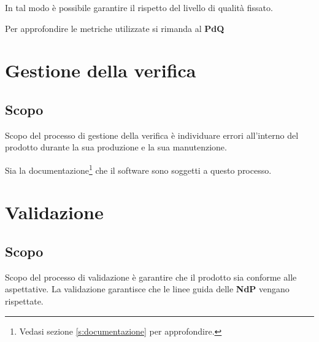 In tal modo è possibile garantire il rispetto del livello
di qualità fissato.

Per approfondire le metriche utilizzate si rimanda al \textbf{PdQ}

\section{Gestione della verifica}\label{s:verifica}
\subsection{Scopo}

Scopo del processo di gestione della verifica è individuare errori all'interno del prodotto durante la sua produzione e la sua manutenzione.

Sia la documentazione\footnote{Vedasi sezione \ref{s:documentazione} per approfondire.} che il software sono soggetti a questo processo.

\section{Validazione}\label{s:validazione}

\subsection{Scopo} Scopo del processo di validazione è garantire che il prodotto sia conforme alle aspettative. La validazione garantisce che le linee guida delle \textbf{NdP} vengano rispettate.
